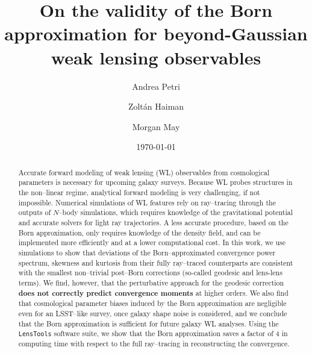 \documentclass[reprint,aps,prd,superscriptaddress,showkeys,showpacs]{revtex4-1}
\newcommand{\ttt}[1]{\texttt{#1}}
\begin{document}
\title{On the validity of the Born approximation for beyond-Gaussian weak lensing observables}

\author{Andrea Petri}

\author{Zolt\'an Haiman}

\author{Morgan May}

\date{\today}

\label{firstpage}

\begin{abstract}
Accurate forward modeling of weak lensing (WL) observables from cosmological parameters is necessary for upcoming galaxy surveys. Because WL probes structures in the non--linear regime, analytical forward modeling is very challenging, if not impossible. Numerical simulations of WL features rely on ray--tracing through the outputs of $N$--body simulations, which requires knowledge of the gravitational potential and accurate solvers for light ray trajectories. A less accurate procedure, based on the Born approximation, only requires knowledge of the density field, and can be implemented more efficiently and at a lower computational cost. In this work, we use simulations to show that deviations of the Born--approximated convergence power spectrum, skewness and kurtosis from their fully ray--traced counterparts are consistent with the smallest non--trivial post--Born corrections (so-called geodesic and lens-lens terms).  We find, however, that the perturbative approach for the geodesic correction \textbf{\color{red} does not correctly predict convergence moments} at higher orders. We also find that cosmological parameter biases induced by the Born approximation are negligible even for an LSST--like survey, once galaxy shape noise is considered, and we conclude that the Born approximation is sufficient for future galaxy WL analyses. Using the \ttt{LensTools} software suite, we show that the Born approximation saves a factor of 4 in computing time with respect to the full ray--tracing in reconstructing the convergence.       
\end{abstract}
\end{document}
